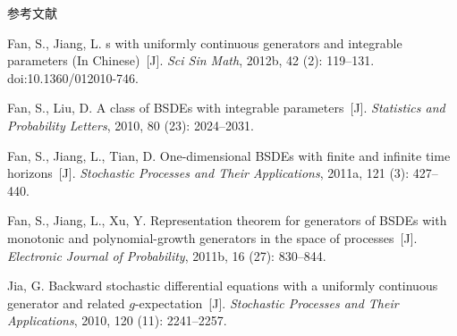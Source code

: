 \documentclass[xcolor=svgnames,serif,table,10pt]{beamer}
\begin{document}
\begin{frame}[allowframebreaks]{参考文献}
\begin{thebibliography}{57}
Fan, S., Jiang, L.
s with uniformly continuous generators and integrable
  parameters ({I}n {C}hinese)~[J].
\newblock \emph{Sci Sin Math}, 2012b, 42 (2): 119--131.
\newblock doi:10.1360/012010-746.

Fan, S., Liu, D.
\newblock A class of {BSDE}s with integrable parameters~[J].
\newblock \emph{Statistics and Probability Letters}, 2010, 80
  (23): 2024--2031.

Fan, S., Jiang, L., Tian, D.
\newblock One-dimensional {BSDE}s with finite and infinite time horizons~[J].
\newblock \emph{Stochastic Processes and Their Applications},
  2011{a}, 121 (3): 427--440.

Fan, S., Jiang, L., Xu, Y.
\newblock Representation theorem for generators of {BSDE}s with monotonic and
  polynomial-growth generators in the space of processes~[J].
\newblock \emph{Electronic Journal of Probability}, 2011b,
  16 (27): 830--844.





Jia, G.
\newblock Backward stochastic differential equations with a uniformly
  continuous generator and related $g$-expectation~[J].
\newblock \emph{Stochastic Processes and Their Applications}, 2010,
  120 (11): 2241--2257.


\end{thebibliography}
\end{frame}
\end{document}
